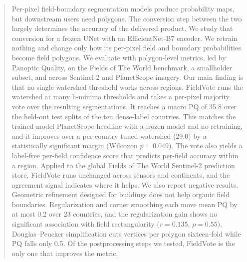 \documentclass[conference]{IEEEtran}
\begin{document}
\begin{strip}
\label{fig:pipeline}
\end{strip}

\begin{abstract}
Per-pixel field-boundary segmentation models produce probability maps, but downstream users need polygons. The conversion step between the two largely determines the accuracy of the delivered product. We study that conversion for a frozen UNet with an EfficientNet-B7 encoder. We retrain nothing and change only how its per-pixel field and boundary probabilities become field polygons. We evaluate with polygon-level metrics, led by Panoptic Quality, on the Fields of The World benchmark, a smallholder subset, and across Sentinel-2 and PlanetScope imagery. Our main finding is that no single watershed threshold works across regions. FieldVote runs the watershed at many h-minima thresholds and takes a per-pixel majority vote over the resulting segmentations. It reaches a macro PQ of 35.8 over the held-out test splits of the ten dense-label countries. This matches the trained-model PlanetScope headline with a frozen model and no retraining, and it improves over a per-country tuned watershed (29.0) by a statistically significant margin (Wilcoxon $p = 0.049$). The vote also yields a label-free per-field confidence score that predicts per-field accuracy within a region. Applied to the global Fields of The World Sentinel-2 prediction store, FieldVote runs unchanged across sensors and continents, and the agreement signal indicates where it helps. We also report negative results. Geometric refinement designed for buildings does not help organic field boundaries. Regularization and corner smoothing each move mean PQ by at most 0.2 over 23 countries, and the regularization gain shows no significant association with field rectangularity ($r = 0.135$, $p = 0.55$). Douglas--Peucker simplification cuts vertices per polygon sixteen-fold while PQ falls only 0.5. Of the postprocessing steps we tested, FieldVote is the only one that improves the metric.
\end{abstract}
\end{document}
